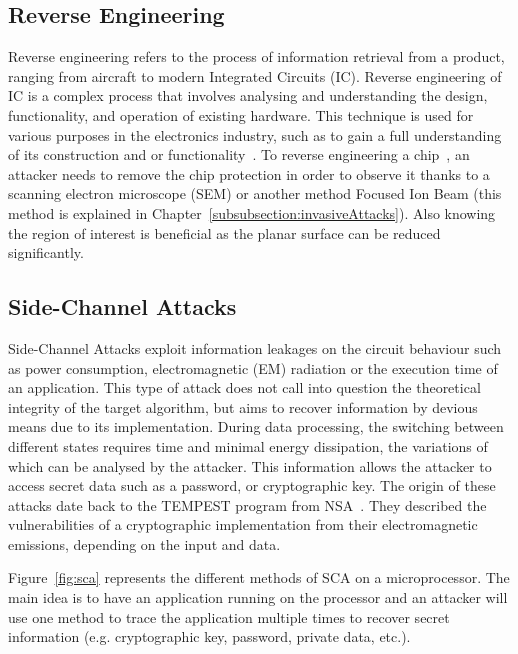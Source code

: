\subsection{Reverse Engineering}
Reverse engineering refers to the process of information retrieval from a product, ranging from aircraft to modern Integrated Circuits (IC). Reverse engineering of IC is a complex process that involves analysing and understanding the design, functionality, and operation of existing hardware. This technique is used for various purposes in the electronics industry, such as to gain a full understanding of its construction and or functionality~\cite{QCFASWCT-16-emergTech}.
To reverse engineering a chip~\cite{FSKWERP-17-ivsw}, an attacker needs to remove the chip protection in order to observe it thanks to a scanning electron microscope (SEM) or another method Focused Ion Beam (this method is explained in Chapter~\ref{subsubsection:invasiveAttacks}). Also knowing the region of interest is beneficial as the planar surface can be reduced significantly.

\subsection{Side-Channel Attacks}
Side-Channel Attacks exploit information leakages on the circuit behaviour such as power consumption, electromagnetic (EM) radiation or the execution time of an application.
This type of attack does not call into question the theoretical integrity of the target algorithm, but aims to recover information by devious means due to its implementation. During data processing, the switching between different states requires time and minimal energy dissipation, the variations of which can be analysed by the attacker.
This information allows the attacker to access secret data such as a password, or cryptographic key. The origin of these attacks date back to the \mbox{TEMPEST} program from NSA~\cite{F-72-nsa}. They described the vulnerabilities of a cryptographic implementation from their electromagnetic emissions, depending on the input and data.

Figure~\ref{fig:sca} represents the different methods of SCA on a microprocessor. The main idea is to have an application running on the processor and an attacker will use one method to trace the application multiple times to recover secret information (e.g. cryptographic key, password, private data, etc.).

